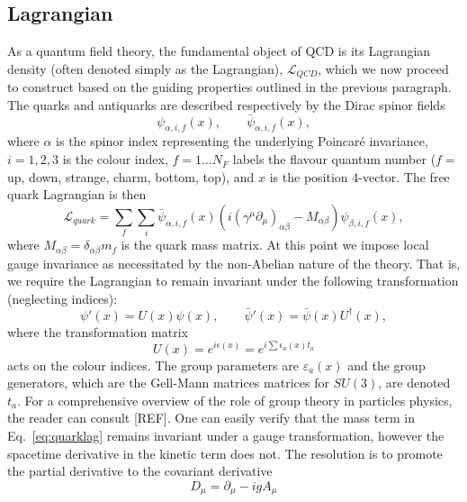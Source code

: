 \documentclass[12pt, a4paper, twoside]{book}
\newcommand{\brac}[1] {\!\left(#1\right)}
\begin{document}
\subsection{Lagrangian}
\label{sec:QCDLagr}
As a quantum field theory, the fundamental object of QCD is its Lagrangian density (often denoted simply as the Lagrangian), \(\mathcal{L}_{QCD}\), which we now proceed to construct based on the guiding properties outlined in the previous paragraph. The quarks and antiquarks are described respectively by the Dirac spinor fields 
\begin{equation}
\psi_{\alpha,i,f}\brac{x}, \quad\quad \bar{\psi}_{\alpha,i,f}\brac{x},
\end{equation} 
where \(\alpha\) is the spinor index representing the underlying Poincar\'e invariance, \(i=1,2,3\) is the colour index, \(f=1\ldots N_{F}\) labels the flavour quantum number (\(f=\) up, down, strange, charm, bottom, top), and \(x\) is the position 4-vector. The free quark Lagrangian is then
\begin{equation}
\label{eq:quarklag}
\mathcal{L}_{quark}=\sum_{f}\sum_{i}\bar{\psi}_{\alpha,i,f}\brac{x}\brac{i\brac{\gamma^{\mu}\partial_{\mu}}_{\alpha\beta}-M_{\alpha\beta}}\psi_{\beta,i,f}\brac{x},
\end{equation}
where \(M_{\alpha\beta}=\delta_{\alpha\beta}m_f\) is the quark mass matrix. At this point we impose local gauge invariance as necessitated by the non-Abelian nature of the theory. That is, we require the Lagrangian to remain invariant under the following transformation (neglecting indices):
\begin{equation}
\psi '\brac{x}=U\brac{x}\psi\brac{x},\quad\quad\bar{\psi}'\brac{x}=\bar{\psi}\brac{x}U^\dagger\brac{x},
\end{equation}
where the transformation matrix 
\begin{equation}
U\brac{x}=e^{i\epsilon\left(x\right)}=e^{i\sum\epsilon_a\brac{x} t_a}
\end{equation}
acts on the colour indices. The group parameters are \(\varepsilon_a\brac{x}\) and the group generators, which are the Gell-Mann matrices matrices for \(SU\brac{3}\), are denoted \(t_a\). For a comprehensive overview of the role of group theory in particles physics, the reader can consult [REF]. One can easily verify that the mass term in Eq.~\eqref{eq:quarklag} remains invariant under a gauge transformation, however the spacetime derivative in the kinetic term does not. The resolution is to promote the partial derivative to the covariant derivative 
\begin{equation}
D_\mu=\partial_\mu-igA_\mu
\end{equation}
\end{document}
